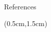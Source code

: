 \documentclass{beamer}
\theoremstyle{definition}
\begin{document}
\begin{frame}{References}
    
    \begin{textblock*}{12cm}(0.5cm,1.5cm)

        
    \end{textblock*}
        

\end{frame}




 

\end{document}
